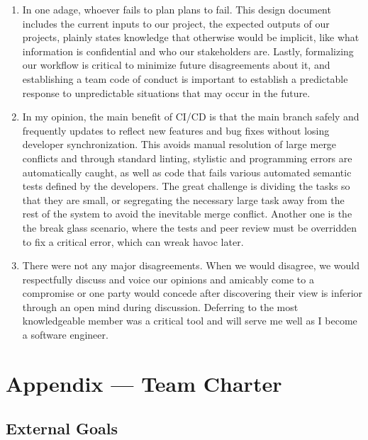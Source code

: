 \documentclass{article}
\begin{document}
\begin{enumerate}
    \item In one adage, whoever fails to plan plans to fail. This design document includes the current inputs to
    our project, the expected outputs of our projects, plainly states knowledge that otherwise would be implicit,
    like what information is confidential and who our stakeholders are. Lastly, formalizing our workflow is critical
    to minimize future disagreements about it, and establishing a team code of conduct is important to establish 
    a predictable response to unpredictable situations that may occur in the future.
  
    \item In my opinion, the main benefit of CI/CD is that the main branch safely and frequently updates to reflect
    new features and bug fixes without losing developer synchronization. This avoids manual resolution of large
    merge conflicts and through standard linting, stylistic and programming errors are automatically caught, 
    as well as code that fails various automated semantic tests defined by the developers. The great challenge
    is dividing the tasks so that they are small, or segregating the necessary large task away from the rest of
    the system to avoid the inevitable merge conflict. Another one is the the break glass scenario, where
    the tests and peer review must be overridden to fix a critical error, which can wreak havoc later.


    \item There were not any major disagreements. When we would disagree, we would respectfully discuss and voice our
    opinions and amicably come to a compromise or one party would concede after discovering their view is inferior through
    an open mind during discussion. Deferring to the most knowledgeable member was a critical tool and will serve me well
    as I become a software engineer.
\end{enumerate}


\newpage{}

\section*{Appendix --- Team Charter}

\subsection*{External Goals}
\end{document}
